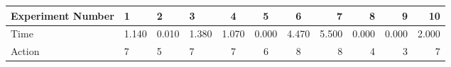 \documentclass[8pt]{article}
\begin{document}
\begin{landscape}
\begin{tabular}{ | l | l | l | l | c | c | c | r | r | r | r | }
 \hline 
Experiment Number & 1 & 2 & 3 & 4 & 5 & 6 & 7 & 8 & 9 & 10\\ \hline
Time & 1.140 & 0.010 & 1.380 & 1.070 & 0.000 & 4.470 & 5.500 & 0.000 & 0.000 & 2.000\\ \hline
Action & 7 & 5 & 7 & 7 & 6 & 8 & 8 & 4 & 3 & 7\\ \hline\end{tabular}
\end{landscape}
\end{document}
